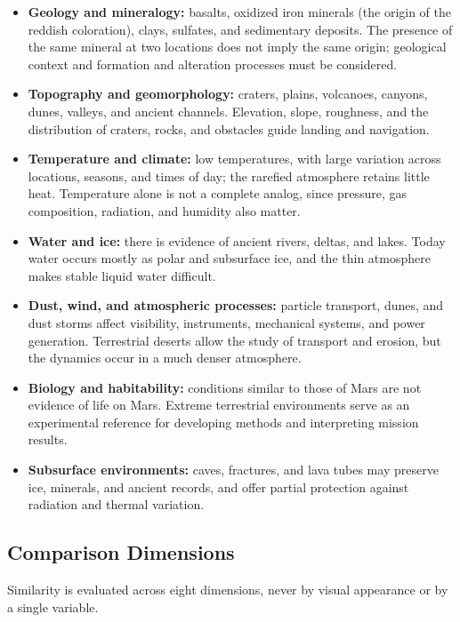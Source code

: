 \documentclass[12pt,letterpaper]{article}
\begin{document}
\begin{itemize}
  \item \textbf{Geology and mineralogy:} basalts, oxidized iron minerals (the origin of the reddish coloration), clays, sulfates, and sedimentary deposits. The presence of the same mineral at two locations does not imply the same origin; geological context and formation and alteration processes must be considered.
  \item \textbf{Topography and geomorphology:} craters, plains, volcanoes, canyons, dunes, valleys, and ancient channels. Elevation, slope, roughness, and the distribution of craters, rocks, and obstacles guide landing and navigation.
  \item \textbf{Temperature and climate:} low temperatures, with large variation across locations, seasons, and times of day; the rarefied atmosphere retains little heat. Temperature alone is not a complete analog, since pressure, gas composition, radiation, and humidity also matter.
  \item \textbf{Water and ice:} there is evidence of ancient rivers, deltas, and lakes. Today water occurs mostly as polar and subsurface ice, and the thin atmosphere makes stable liquid water difficult.
  \item \textbf{Dust, wind, and atmospheric processes:} particle transport, dunes, and dust storms affect visibility, instruments, mechanical systems, and power generation. Terrestrial deserts allow the study of transport and erosion, but the dynamics occur in a much denser atmosphere.
  \item \textbf{Biology and habitability:} conditions similar to those of Mars are not evidence of life on Mars. Extreme terrestrial environments serve as an experimental reference for developing methods and interpreting mission results.
  \item \textbf{Subsurface environments:} caves, fractures, and lava tubes may preserve ice, minerals, and ancient records, and offer partial protection against radiation and thermal variation.
\end{itemize}

\subsection{Comparison Dimensions}

Similarity is evaluated across eight dimensions, never by visual appearance or by a single variable.
\end{document}
